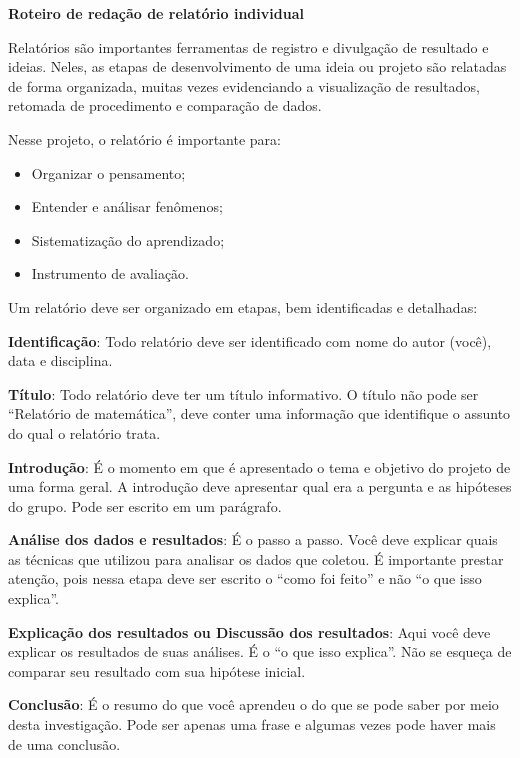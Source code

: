 \cleardoublepage
{}\label{relatorio-individual}
\centering
\textbf{\Large\color{\currentcolor} Roteiro de redação de relatório individual}
\justify

Relatórios são importantes ferramentas de registro e divulgação de resultado e ideias. Neles, as etapas de desenvolvimento de uma ideia ou projeto são relatadas de forma organizada, muitas vezes evidenciando a visualização de resultados, retomada de procedimento e comparação de dados. 

Nesse projeto, o relatório é importante para:

\begin{itemize}
\item Organizar o pensamento;
\item Entender e análisar fenômenos;
\item Sistematização do aprendizado;
\item Instrumento de avaliação.
\end{itemize}

Um relatório  deve ser organizado em etapas, bem identificadas e detalhadas:
\setlength\parskip{1.5em}

\noindent\textbf{Identificação}: Todo relatório deve ser identificado com nome do autor (você), data e disciplina.

\noindent\textbf{Título}: Todo relatório deve ter um título informativo. O título não pode ser “Relatório de matemática”, deve conter uma informação que identifique o assunto do qual o relatório trata.

\noindent\textbf{Introdução}: É o momento em que é apresentado o tema e objetivo do projeto de uma forma geral. A introdução deve apresentar qual era a pergunta e as hipóteses do grupo. Pode ser escrito em um parágrafo.

\noindent\textbf{Análise dos dados e resultados}:  É o passo a passo. Você deve explicar quais as técnicas que utilizou para analisar os dados que coletou. É importante prestar atenção, pois nessa etapa deve ser escrito o “como foi feito” e não “o que isso explica”. 

\noindent\textbf{Explicação dos resultados ou Discussão dos resultados}: Aqui você deve explicar os resultados de suas análises. É o “o que isso explica”.  Não se esqueça de comparar seu resultado com sua hipótese inicial.

\noindent\textbf{Conclusão}: É o resumo do que você aprendeu o do que se pode saber por meio  desta investigação. Pode ser apenas uma frase e algumas vezes pode haver mais de uma conclusão.

